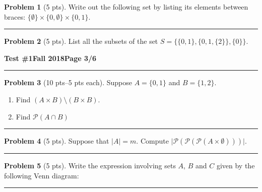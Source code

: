 \documentclass[11pt]{article}
\theoremstyle{definition}
\newtheorem{problem}{Problem}
\begin{document}
\begin{problem}[5 pts]
  Write out the following set by listing its elements between braces: $\{ \emptyset \} \times \{0, \emptyset \} \times
  \{ 0, 1 \}$.

  \vspace{3cm}
\end{problem}
\hrule

\begin{problem}[5 pts]
  List all the subsets of the set $S=\big\{ \{0,1\}, \{ 0,1, \{2\} \}, \{ 0 \} \big\}$.

\end{problem}
\newpage

\hfill{\large\bf Test \#1}\hfill{\large\bf Fall 2018}\hfill{\large\bf Page 3/6}\hrule

\bigskip

\begin{problem}[10 pts--5 pts each]
  Suppose $A=\{0,1\}$ and $B=\{1,2\}$.
  \begin{enumerate}
  \item Find $(A \times B) \setminus (B \times B)$.
    \vspace{1.5cm}
  \item Find $\mathscr{P}(A \cap B)$
  \end{enumerate}
  \vspace{1.5cm}
\end{problem}
\hrule

\begin{problem}[5 pts]
  Suppose that $\lvert A \rvert = m$.  Compute $\big\lvert \mathscr{P}( \mathscr{P}( \mathscr{P} ( A \times \emptyset ))) \big\rvert$.

  \vspace{3cm}
\end{problem}
\hrule

\begin{problem}[5 pts]\label{venn}
  Write the expression involving sets $A$, $B$ and $C$ given by the following Venn diagram:
  \begin{center}
  \end{center}

  \vspace{1cm}
\end{problem}
\hrule
\end{document}
